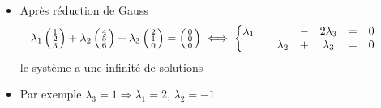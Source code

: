 \begin{frame}
\begin{exemple}
\begin{itemize}
\setlength{\itemsep}{9pt}
\item
Apr\`es r\'eduction de Gauss
$$\hspace*{-2em}\lambda_1\left(\begin{smallmatrix}
1\\2\\3
\end{smallmatrix}\right)
+\lambda_2\left(\begin{smallmatrix}
4\\5\\6
\end{smallmatrix}\right) 
+\lambda_3\left(\begin{smallmatrix}
2\\1\\0
\end{smallmatrix}\right) = 
\left(\begin{smallmatrix}
0\\0\\0
\end{smallmatrix}\right)
\iff \left \{ \begin{matrix}
\lambda_1&& &-&2 \lambda_{3}&=&0 \cr
&&\lambda_2&+&\lambda_{3}&=&0\cr
\end{matrix}\right .$$
le syst\`eme a une infinité de solutions
\pause
\item
Par exemple $\lambda_3=1 \Rightarrow \lambda_1=2$, $ \lambda_2=-1$


\end{itemize}
\end{exemple}
\end{frame}
